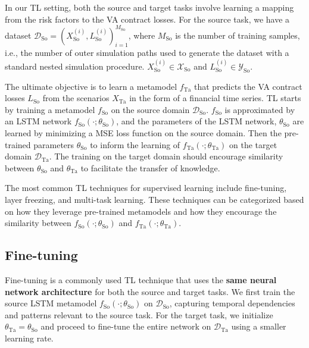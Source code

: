 In our TL setting, both the source and target tasks involve learning a mapping from the risk factors to the VA contract losses.
For the source task, we have a dataset $\mathcal{D}_{\text{So}} = { (X_{\text{So}}^{(i)}, L_{\text{So}}^{(i)}) }_{i=1}^{M_{\text{So}}}$, where $M_{\text{So}}$ is the number of training samples, i.e., the number of outer simulation paths used to generate the dataset with a standard nested simulation procedure.
$X_{\text{So}}^{(i)} \in \mathcal{X}_{\text{So}}$ and $L_{\text{So}}^{(i)} \in \mathcal{Y}_{\text{So}}$.
 
The ultimate objective is to learn a metamodel $f_{\text{Ta}}$ that predicts the VA contract losses $L_{\text{So}}$ from the scenarios $X_{\text{Ta}}$ in the form of a financial time series.
TL starts by training a metamodel $f_{\text{So}}$ on the source domain $\mathcal{D}_{\text{So}}$.
$f_{\text{So}}$ is approximated by an LSTM network $f_{\text{So}}(\cdot ; \theta_{\text{So}})$, and the parameters of the LSTM network, $\theta_{\text{So}}$ are learned by minimizing a MSE loss function on the source domain.
Then the pre-trained parameters $\theta_{\text{So}}$ to inform the learning of $f_{\text{Ta}}(\cdot ; \theta_{\text{Ta}})$ on the target domain $\mathcal{D}_{\text{Ta}}$.
The training on the target domain should encourage similarity between $\theta_{\text{So}}$ and $\theta_{\text{Ta}}$ to facilitate the transfer of knowledge.

The most common TL techniques for supervised learning include fine-tuning, layer freezing, and multi-task learning. 
These techniques can be categorized based on how they leverage pre-trained metamodels and how they encourage the similarity between $f_{\text{So}}(\cdot ; \theta_{\text{So}})$ and $f_{\text{Ta}}(\cdot ; \theta_{\text{Ta}})$.

\subsection{Fine-tuning}

Fine-tuning is a commonly used TL technique that uses the \textbf{same neural network architecture} for both the source and target tasks.
We first train the source LSTM metamodel $f_{\text{So}}(\cdot; \theta_{\text{So}})$ on $\mathcal{D}_{\text{So}}$, capturing temporal dependencies and patterns relevant to the source task. 
For the target task, we initialize $\theta_{\text{Ta}} = \theta_{\text{So}}$ and proceed to fine-tune the entire network on $\mathcal{D}_{\text{Ta}}$ using a smaller learning rate. 


